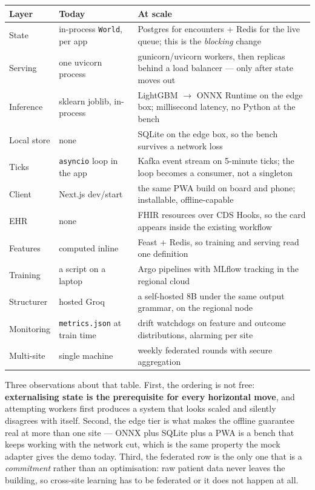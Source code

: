 \documentclass[10pt,a4paper,twocolumn]{article}
\newcommand{\cm}[1]{\texttt{#1}}
\begin{document}
\begin{center}\footnotesize\sffamily
\begin{tabular}{@{}p{1.5cm}p{2.6cm}p{3.2cm}@{}}
\toprule
\rowcolor{AccPurple!10}
\textbf{Layer} & \textbf{Today} & \textbf{At scale}\\
\midrule
State & in-process \cm{World}, per app & Postgres for encounters + Redis for the live queue; this is the \emph{blocking} change\\
\addlinespace[2pt]
Serving & one uvicorn process & gunicorn/uvicorn workers, then replicas behind a load balancer --- only after state moves out\\
\addlinespace[2pt]
Inference & sklearn joblib, in-process & LightGBM $\rightarrow$ ONNX Runtime on the edge box; millisecond latency, no Python at the bench\\
\addlinespace[2pt]
Local store & none & SQLite on the edge box, so the bench survives a network loss\\
\addlinespace[2pt]
Ticks & \cm{asyncio} loop in the app & Kafka event stream on 5-minute ticks; the loop becomes a consumer, not a singleton\\
\addlinespace[2pt]
Client & Next.js dev/\allowbreak start & the same PWA build on board and phone; installable, offline-capable\\
\addlinespace[2pt]
EHR & none & FHIR resources over CDS Hooks, so the card appears inside the existing workflow\\
\addlinespace[2pt]
Features & computed inline & Feast + Redis, so training and serving read one definition\\
\addlinespace[2pt]
Training & a script on a laptop & Argo pipelines with MLflow tracking in the regional cloud\\
\addlinespace[2pt]
Structurer & hosted Groq & a self-hosted 8B under the same output grammar, on the regional node\\
\addlinespace[2pt]
Monitoring & \cm{metrics.json} at train time & drift watchdogs on feature and outcome distributions, alarming per site\\
\addlinespace[2pt]
Multi-site & single machine & weekly federated rounds with secure aggregation\\
\bottomrule
\end{tabular}
\end{center}

\vspace{4pt}
Three observations about that table. First, the ordering is not free: \textbf{externalising state
is the prerequisite for every horizontal move}, and attempting workers first produces a system that
looks scaled and silently disagrees with itself. Second, the edge tier is what makes the offline
guarantee real at more than one site --- ONNX plus SQLite plus a PWA is a bench that keeps working
with the network cut, which is the same property the mock adapter gives the demo today. Third, the
federated row is the only one that is a \emph{commitment} rather than an optimisation: raw patient
data never leaves the building, so cross-site learning has to be federated or it does not happen at
all.
\end{document}
